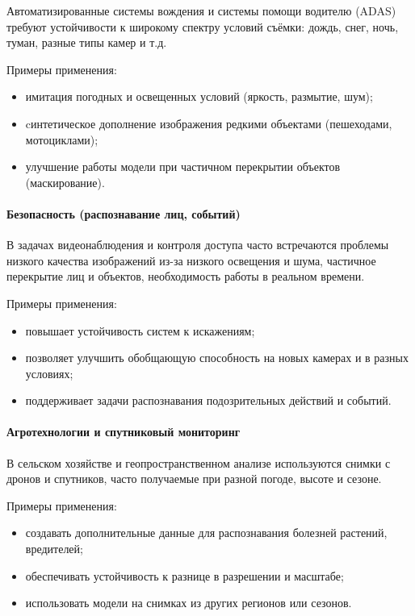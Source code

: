 Автоматизированные системы вождения и системы помощи водителю (ADAS) требуют устойчивости к широкому спектру условий съёмки: дождь, снег, ночь, туман, разные типы камер и т.д.

Примеры применения:

\begin{itemize}
	\item имитация погодных и освещенных условий (яркость, размытие, шум);
	\item cинтетическое дополнение изображения редкими объектами (пешеходами, мотоциклами);
	\item улучшение работы модели при частичном перекрытии объектов (маскирование).
\end{itemize}

\paragraph{Безопасность (распознавание лиц, событий)}

В задачах видеонаблюдения и контроля доступа часто встречаются проблемы низкого качества изображений из-за низкого освещения и шума, частичное перекрытие лиц и объектов, необходимость работы в реальном времени.

Примеры применения:

\begin{itemize}
	\item повышает устойчивость систем к искажениям;
	\item позволяет улучшить обобщающую способность на новых камерах и в разных условиях;
	\item поддерживает задачи распознавания подозрительных действий и событий.
\end{itemize}

\paragraph{Агротехнологии и спутниковый мониторинг}

В сельском хозяйстве и геопространственном анализе используются снимки с дронов и спутников, часто получаемые при разной погоде, высоте и сезоне.


Примеры применения:

\begin{itemize}
	\item создавать дополнительные данные для распознавания болезней растений, вредителей;
	\item обеспечивать устойчивость к разнице в разрешении и масштабе;
	\item использовать модели на снимках из других регионов или сезонов.
\end{itemize}

